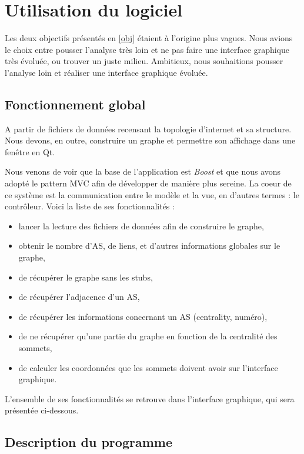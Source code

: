 \section{Utilisation du logiciel}

Les deux objectifs présentés en \ref{obj} étaient à l'origine plus vagues. Nous avions le choix entre pousser l'analyse très loin et ne pas faire une interface graphique très évoluée, ou trouver un juste milieu. Ambitieux, nous souhaitions pousser l'analyse loin et réaliser une interface graphique évoluée.

\subsection{Fonctionnement global}
A partir de fichiers de données recensant la topologie d'internet et sa structure. Nous devons, en outre, construire un graphe et permettre son affichage dans une fenêtre en Qt.

Nous venons de voir que la base de l'application est \textit{Boost} et que nous avons adopté le pattern MVC afin de développer de manière plus sereine. La coeur de ce système est la communication entre le modèle et la vue, en d'autres termes : le contrôleur. Voici la liste de ses fonctionnalités :
\begin{itemize}
 \item lancer la lecture des fichiers de données afin de construire le graphe,
\item obtenir le nombre d'AS, de liens, et d'autres informations globales sur le graphe,
\item de récupérer le graphe sans les stubs,
\item de récupérer l'adjacence d'un AS,
\item de récupérer les informations concernant un AS (centrality, numéro),
\item de ne récupérer qu'une partie du graphe en fonction de la centralité des sommets,
\item de calculer les coordonnées que les sommets doivent avoir sur l'interface graphique.
\end{itemize}

L'ensemble de ses fonctionnalités se retrouve dans l'interface graphique, qui sera présentée ci-dessous.

\subsection{Description du programme}

